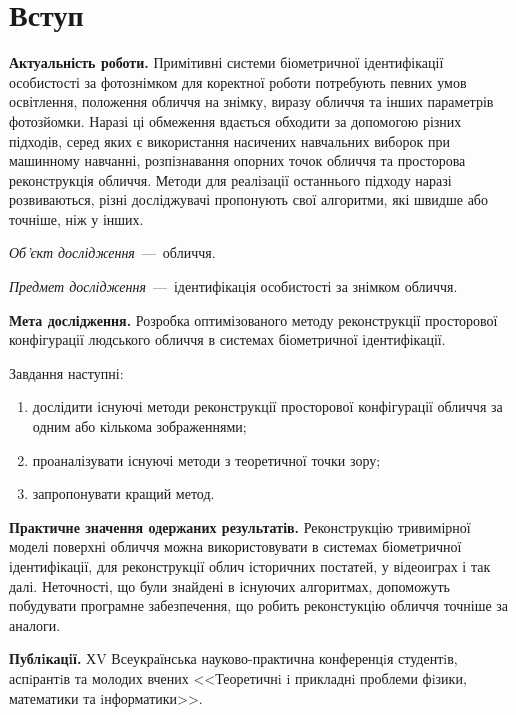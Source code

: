 \chapter*{Вступ}

\textbf{Актуальність роботи.}
Примітивні системи біометричної ідентифікації особистості за фотознімком
для коректної роботи потребують певних умов
освітлення, положення обличчя на знімку, виразу обличчя
та інших параметрів фотозйомки.
Наразі ці обмеження вдається обходити за допомогою різних підходів,
серед яких є
використання насичених навчальних виборок при машинному навчанні,
розпізнавання опорних точок обличчя
та просторова реконструкція обличчя.
Методи для реалізації останнього підходу наразі розвиваються,
різні досліджувачі пропонують свої алгоритми,
які швидше або точніше, ніж у інших.

\textit{Об’єкт дослідження}~---~обличчя.

\textit{Предмет дослідження}~---~ідентифікація особистості за знімком обличчя.

\textbf{Мета дослідження.}
Розробка оптимізованого методу реконструкції просторової конфігурації
людського обличчя в системах біометричної ідентифікації.

Завдання наступні:
\begin{enumerate}
  \item
    дослідити існуючі методи реконструкції просторової конфігурації обличчя
    за одним або кількома зображеннями;
  \item
    проаналізувати існуючі методи з теоретичної точки зору;
  \item
    запропонувати кращий метод.
\end{enumerate}

\textbf{Практичне значення одержаних результатів.}
Реконструкцію тривимірної моделі поверхні обличчя
можна використовувати в системах біометричної ідентифікації,
для реконструкції облич історичних постатей,
у відеоиграх і так далі.
Неточності, що були знайдені в існуючих алгоритмах,
допоможуть побудувати програмне забезпечення,
що робить реконстукцію обличчя точніше за аналоги.

\textbf{Публiкацiї.}
ХV Всеукраїнська науково-практична конференцiя студентiв,
аспiрантiв та молодих вчених
<<Теоретичнi i прикладнi проблеми фiзики, математики та iнформатики>>.
